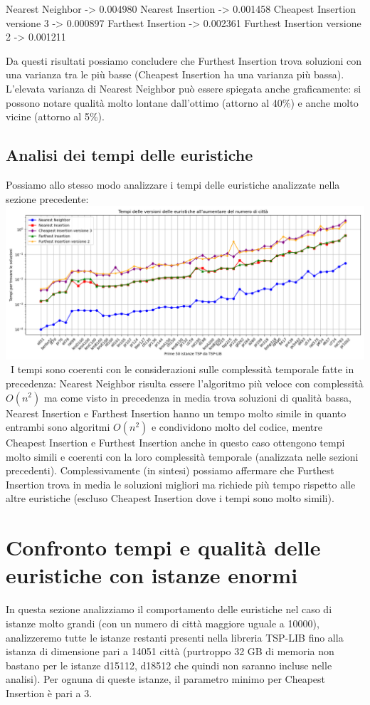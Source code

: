 \documentclass[a4paper,12pt]{report}
\begin{document}
\begin{myverbatim}
Nearest Neighbor ->              0.004980
Nearest Insertion ->             0.001458
Cheapest Insertion versione 3 -> 0.000897
Farthest Insertion ->            0.002361
Furthest Insertion versione 2 -> 0.001211
\end{myverbatim}
Da questi risultati possiamo concludere che Furthest Insertion trova soluzioni con una varianza tra le più basse (Cheapest Insertion ha una varianza più bassa). L'elevata varianza di Nearest Neighbor può essere spiegata anche graficamente: si possono notare qualità molto lontane dall'ottimo (attorno al 40\%) e anche molto vicine (attorno al 5\%).
\subsection{Analisi dei tempi delle euristiche}
Possiamo allo stesso modo analizzare i tempi delle euristiche analizzate nella sezione precedente: \newline
\includegraphics[width=1\textwidth]{../Grafici/8.png} \
I tempi sono coerenti con le considerazioni sulle complessità temporale fatte in precedenza: Nearest Neighbor risulta essere l'algoritmo più veloce con complessità $O(n^2)$ ma come visto in precedenza in media trova soluzioni di qualità bassa, Nearest Insertion e Farthest Insertion hanno un tempo molto simile in quanto entrambi sono algoritmi $O(n^2)$ e condividono molto del codice, mentre Cheapest Insertion e Furthest Insertion anche in questo caso ottengono tempi molto simili e coerenti con la loro complessità temporale (analizzata nelle sezioni precedenti). \newline Complessivamente (in sintesi) possiamo affermare che Furthest Insertion trova in media le soluzioni migliori ma richiede più tempo rispetto alle altre euristiche (escluso Cheapest Insertion dove i tempi sono molto simili).

\section{Confronto tempi e qualità delle euristiche con istanze enormi}
In questa sezione analizziamo il comportamento delle euristiche nel caso di istanze molto grandi (con un numero di città maggiore uguale a 10000), analizzeremo tutte le istanze restanti presenti nella libreria TSP-LIB fino alla istanza di dimensione pari a 14051 città (purtroppo 32 GB di memoria non bastano per le istanze d15112, d18512 che quindi non saranno incluse nelle analisi). Per ognuna di queste istanze, il parametro minimo per Cheapest Insertion è pari a 3. \newline
\end{document}

